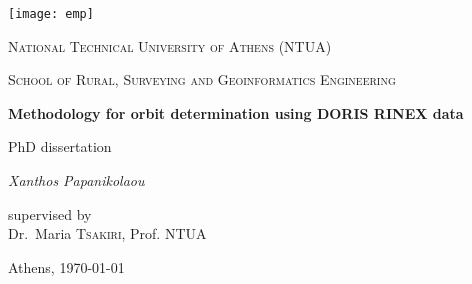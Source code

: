\begin{titlepage}
  \centering
  \texttt{[image: emp]}\par\vspace{1cm}
  {\Large \textsc{National Technical University of Athens (NTUA)} \par}
  {\Large \textsc{School of Rural, Surveying and Geoinformatics Engineering} \par}
  \vspace{.5cm}
  {\huge\bfseries Methodology for orbit determination using DORIS RINEX data \par}
  \vspace{2cm}
  {\large PhD dissertation}\\
  \vspace{.15cm}
  {\Large\itshape Xanthos Papanikolaou\par}
  \vfill
  supervised by\\
  Dr.~Maria \textsc{Tsakiri}, Prof. NTUA
  \vfill
  {\large Athens, \monthyeardate\today\par}
\end{titlepage}
\thispagestyle{empty}
